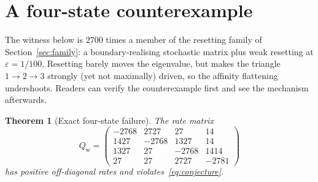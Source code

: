 \documentclass[11pt,a4paper]{article}
\numberwithin{equation}{section}
\newtheorem{theorem}{Theorem}[section]
\theoremstyle{definition}
\theoremstyle{remark}
\newcommand{\eps}{\varepsilon}
\newcommand{\Qw}{Q_{\mathrm{w}}}
\begin{document}
\section{A four-state counterexample}
\label{sec:witness}

The witness below is \(2700\) times a member of the resetting family of
Section~\ref{sec:family}: a boundary-realising stochastic matrix plus
weak resetting at \(\eps=1/100\). Resetting barely moves the
eigenvalue, but makes the triangle \(1\to2\to3\) strongly (yet not
maximally) driven, so the affinity flattening undershoots. Readers can
verify the counterexample first and see the mechanism afterwards.

\begin{theorem}[Exact four-state failure]
\label{thm:witness}
The rate matrix
\begin{equation}
\Qw=
\begin{pmatrix}
-2768&2727&27&14\\
1427&-2768&1327&14\\
1327&27&-2768&1414\\
27&27&2727&-2781
\end{pmatrix}
\label{eq:Qstar}
\end{equation}
has positive off-diagonal rates and violates~\eqref{eq:conjecture}.
\end{theorem}
\end{document}

